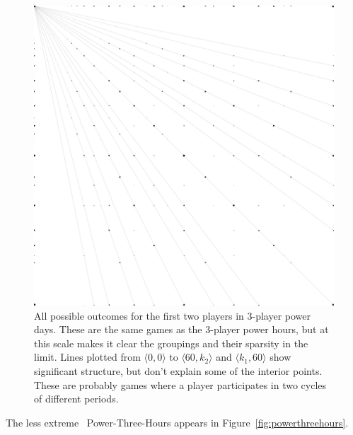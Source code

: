 \documentclass[twocolumn]{article}
\begin{document}
\begin{figure}
\begin{center}
\includegraphics[width=0.90 \linewidth]{powerday3.pdf}
\end{center}\vspace{-0.1in}
\caption{All possible outcomes for the first two players in 3-player
  power days. These are the same games as the 3-player power hours,
  but at this scale makes it clear the groupings and their sparsity in
  the limit. Lines plotted from $\langle 0,0 \rangle$ to $\langle 60,
  k_2 \rangle$ and $\langle k_1, 60 \rangle$ show significant
  structure, but don't explain some of the interior points. These are
  probably games where a player participates in two cycles of
  different periods.
}
\label{fig:powerday3}
\end{figure}

The less extreme \kn\ Power-Three-Hours appears in
Figure~\ref{fig:powerthreehours}.
\end{document}
